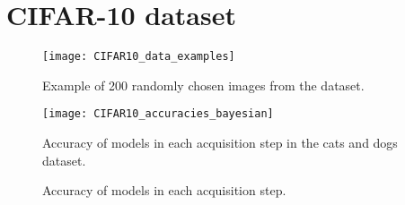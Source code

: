 


\section{CIFAR-10 dataset}


\begin{figure}[H]
    \centering
    \texttt{[image: CIFAR10\_data\_examples]}
    \caption{Example of 200 randomly chosen images from the dataset.}
    \label{fig:CIFAR10_data_examples}
\end{figure}


\begin{figure}[H]
    \centering
    \texttt{[image: CIFAR10\_accuracies\_bayesian]}
    \caption{Accuracy of models in each acquisition step in the cats and dogs dataset.}
    \label{fig:CIFAR10_accuracies_bayesian}
\end{figure}



\begin{figure}[H]
    \centering
    \hfill
    \caption{Accuracy of models in each acquisition step.}
    \label{fig:CIFAR10_bayesian_vs_freq}
\end{figure}




